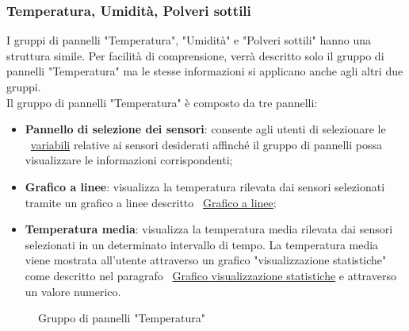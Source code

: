 \subsubsection{Temperatura, Umidità, Polveri sottili}
I gruppi di pannelli "Temperatura", "Umidità" e "Polveri sottili" hanno una struttura simile. Per facilità di comprensione, verrà descritto solo il gruppo di pannelli "Temperatura" ma le stesse informazioni si applicano anche agli altri due gruppi.\\ 
Il gruppo di pannelli "Temperatura" è composto da tre pannelli:
\begin{itemize}
    \item \textbf{Pannello di selezione dei sensori}: consente agli utenti di selezionare le ~\hyperlink{par:variabili_panel}{variabili} relative ai sensori desiderati affinché il gruppo di pannelli possa visualizzare le informazioni corrispondenti;
    \item \textbf{Grafico a linee}: visualizza la temperatura rilevata dai sensori selezionati tramite un grafico a linee descritto ~\hyperlink{par:grafico_linee}{Grafico a linee};
    \item \textbf{Temperatura media}: visualizza la temperatura media rilevata dai sensori selezionati in un determinato intervallo di tempo. La temperatura media viene mostrata all'utente attraverso un grafico "visualizzazione statistiche" come descritto nel paragrafo ~\hyperlink{par:visu_stat}{Grafico visualizzazione statistiche} e attraverso un valore numerico.
\end{itemize}
\begin{figure}[H]
    \centering
    \caption{Gruppo di pannelli "Temperatura"}
    \label{fig:my_label}
\end{figure}

